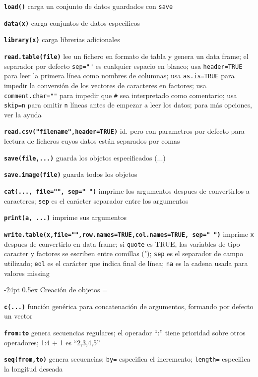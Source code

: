 \documentclass[10pt,landscape]{article}
\makeatletter
\renewcommand\section{\@startsection{section}{1}{0mm}%
                                     {-24pt}%
                                     {0.5ex}%
                                {\color[rgb]{1,0.54902,0}\normalfont\large\bfseries}}
\newcommand{\code}{\texttt}
\newcommand{\bcode}[1]{\texttt{\textbf{#1}}}
\makeatother
\begin{document}
\begin{multicols*}{3}
\bcode{load()} carga un conjunto de datos guardados con \code{save}

\bcode{data(x)} carga conjuntos de datos especificos

\bcode{library(x)} carga librerias adicionales

\bcode{read.table(file)} lee un fichero en formato de tabla y genera un data frame; el separador por defecto \code{sep=""} es cualquier espacio en blanco; usa \code{header=TRUE} para leer la primera línea como nombres de columnas; usa \code{as.is=TRUE} para impedir la conversión de los vectores de caracteres en factores; usa \code{comment.char=""} para impedir que \code{\#} sea interpretado como comentario; usa \code{skip=n} para omitir \code{n} líneas antes de empezar a leer los datos; para más opciones, ver la ayuda

\bcode{read.csv("filename",header=TRUE)} id. pero con parametros por defecto para lectura de ficheros cuyos datos están separados por comas

\bcode{save(file,...)} guarda los objetos especificados (...) 

\bcode{save.image(file)} guarda todos los objetos

\bcode{cat(..., file="", sep=" ")} imprime los argumentos despues de convertirlos a caracteres; \code{sep} es el carácter separador entre los argumentos

\bcode{print(a, ...)} imprime sus argumentos 

\bcode{write.table(x,file="",row.names=TRUE,col.names=TRUE,
	sep=" ")} 
imprime \code{x} despues de convertirlo en data frame; si \code{quote} es TRUE, las variables de tipo caracter y factores se escriben entre comillas ("); \code{sep} es el separador de campo utilizado; \code{eol} es el carácter que indica final de línea; \code{na} es la cadena usada para valores missing



\section{Creación de objetos}
\everypar={\hangindent=9mm}

\bcode{c(...)} función genérica para concatenación de argumentos, formando por defecto un vector

\bcode{from:to} genera secuencias regulares; el operador ``:'' tiene prioridad sobre otros operadores; 1:4
+ 1 es ``2,3,4,5''

\bcode{seq(from,to)} genera secuencias; \code{by=} especifica el incremento; \code{length=} especifica la longitud deseada


\end{multicols*}
\end{document}
